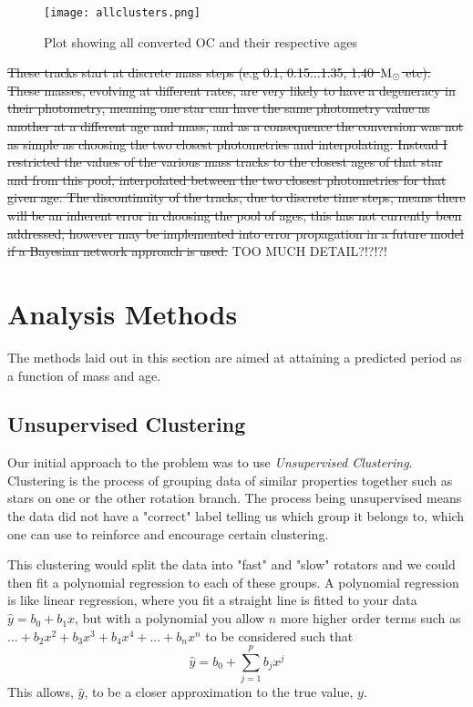 \documentclass[fleqn,usenatbib]{mnras}
\begin{document}
\begin{figure}
	\centering
	\texttt{[image: allclusters.png]}
	\caption[]{Plot showing all converted OC and their respective ages}
	\label{fig:allclusters}
\end{figure}

\sout{These tracks start at discrete mass steps (e.g 0.1, 0.15...1.35, 1.40~$\textup{M}_\odot$ etc).
These masses, evolving at different rates, are very likely to have a degeneracy in their photometry, meaning one star can have the same photometry value as another at a different age and mass, and as a consequence the conversion was not as simple as choosing the two closest photometries and interpolating.
Instead I restricted the values of the various mass tracks to the closest ages of that star and from this pool, interpolated between the two closest photometries for that given age.
The discontinuity of the tracks, due to discrete time steps, means there will be an inherent error in choosing the pool of ages, this has not currently been addressed, however may be implemented into error propagation in a future model if a Bayesian network approach is used.} TOO MUCH DETAIL?!?!?!

\section{Analysis Methods}
The methods laid out in this section are aimed at attaining a predicted period as a function of mass and age.
\subsection{Unsupervised Clustering}
Our initial approach to the problem was to use \textit{Unsupervised Clustering}.
Clustering is the process of grouping data of similar properties together such as stars on one or the other rotation branch.
The process being unsupervised means the data did not have a "correct" label telling us which group it belongs to, which one can use to reinforce and encourage certain clustering.

This clustering would split the data into "fast" and "slow" rotators and we could then fit a polynomial regression to each of these groups.
A polynomial regression is like linear regression, where you fit a straight line is fitted to your data $\hat{y} = b_0 + b_1x$, but with a polynomial you allow $n$ more higher order terms such as $...+ b_2x^2 + b_3x^3+b_4x^4+...+b_nx^n $ to be considered such that
\begin{equation}
	\label{eq:poly}
	\hat{y} = b_0 + \sum_{j = 1}^p b_jx^j
\end{equation}
This allows,  $\hat{y}$, to be a closer approximation to the true value, $y$.
\end{document}
